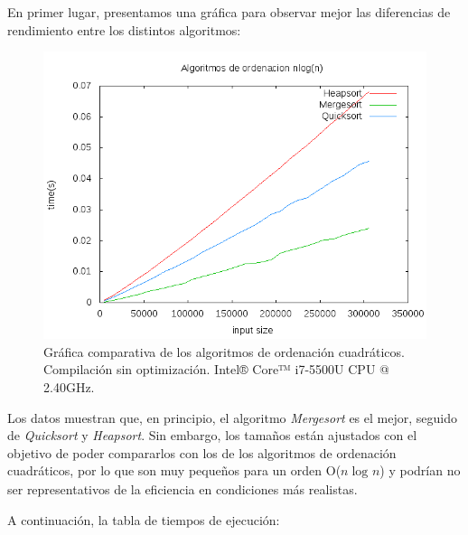 \documentclass[11pt,a4paper]{article}
\begin{document}
				\par
				En primer lugar, presentamos una gráfica para observar mejor las diferencias de rendimiento entre los distintos algoritmos:

				\begin{figure}[h]

					\centering
					\includegraphics[width=1\textwidth]{Nlogn.png}
					\caption{Gráfica comparativa de los algoritmos de ordenación cuadráticos. Compilación sin optimización. Intel® Core™ i7-5500U CPU @ 2.40GHz.}

				\end{figure}

				\par
				Los datos muestran que, en principio, el algoritmo \textit{Mergesort} es el mejor, seguido de \textit{Quicksort} y \textit{Heapsort}. Sin embargo, los tamaños están ajustados con el objetivo de poder compararlos con los de los algoritmos de ordenación cuadráticos, por lo que son muy pequeños para un orden O($n\log_{}n$) y podrían no ser representativos de la eficiencia en condiciones más realistas.

\newpage

				\par
				A continuación, la tabla de tiempos de ejecución:
\end{document}
